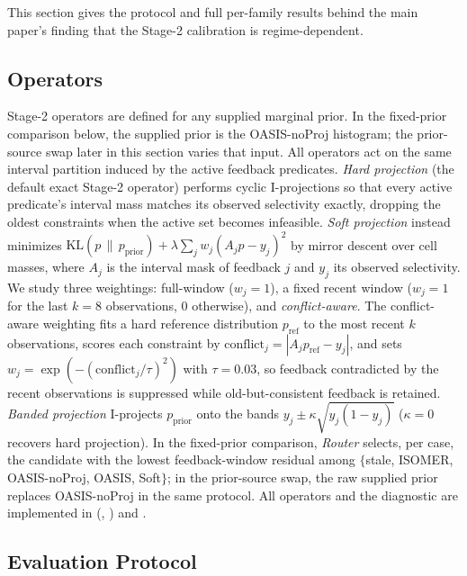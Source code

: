 \documentclass[11pt]{article}
\begin{document}
This section gives the protocol and full per-family results behind the main
paper's finding that the Stage-2 calibration is regime-dependent.

\subsection{Operators}

Stage-2 operators are defined for any supplied marginal prior. In the fixed-prior
comparison below, the supplied prior is the OASIS-noProj histogram; the
prior-source swap later in this section varies that input. All operators act on
the same interval partition induced by the active feedback predicates. \emph{Hard
projection} (the default exact Stage-2 operator) performs cyclic I-projections so
that every active predicate's interval mass matches its observed selectivity
exactly, dropping the oldest constraints when the active set becomes infeasible.
\emph{Soft projection} instead minimizes
$\mathrm{KL}(p\,\|\,p_{\text{prior}}) + \lambda\sum_j w_j (A_j p - y_j)^2$ by
mirror descent over cell masses, where $A_j$ is the interval mask of feedback
$j$ and $y_j$ its observed selectivity. We study three weightings: full-window
($w_j{=}1$), a fixed recent window ($w_j{=}1$ for the last $k{=}8$ observations,
$0$ otherwise), and \emph{conflict-aware}. The conflict-aware weighting fits a
hard reference distribution $p_{\text{ref}}$ to the most recent $k$ observations,
scores each constraint by $\text{conflict}_j = |A_j p_{\text{ref}} - y_j|$, and
sets $w_j = \exp(-(\text{conflict}_j/\tau)^2)$ with $\tau{=}0.03$, so feedback
contradicted by the recent observations is suppressed while old-but-consistent
feedback is retained. \emph{Banded projection} I-projects $p_{\text{prior}}$
onto the bands $y_j\pm\kappa\sqrt{y_j(1-y_j)}$ ($\kappa{=}0$ recovers hard
projection). In the fixed-prior comparison, \emph{Router} selects,
per case, the candidate with the lowest feedback-window residual among
$\{$stale, ISOMER, OASIS-noProj, OASIS, Soft$\}$; in the
prior-source swap, the raw supplied prior replaces OASIS-noProj in the same
protocol. All operators and the diagnostic are implemented in
 (,
) and .

\subsection{Evaluation Protocol}
\end{document}
